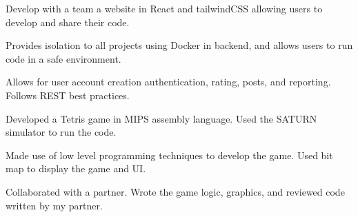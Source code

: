 \documentclass[letterpaper,10pt]{article}
\begin{document}
    \begin{resume_list}
        \item Develop with a team a website in React and tailwindCSS allowing users to develop and share their code.
        \item Provides isolation to all projects using Docker in backend, and allows users to run code in a safe environment.
        \item Allows for user account creation authentication, rating, posts, and reporting. Follows REST best practices.
    \end{resume_list}
    \begin{resume_list}
        \item Developed a Tetris game in MIPS assembly language. Used the SATURN simulator to run the code.
        \item Made use of low level programming techniques to develop the game. Used bit map to display the game and UI.
        \item Collaborated with a partner. Wrote the game logic, graphics, and reviewed code written by my partner.
    \end{resume_list}
    


    
\end{document}
